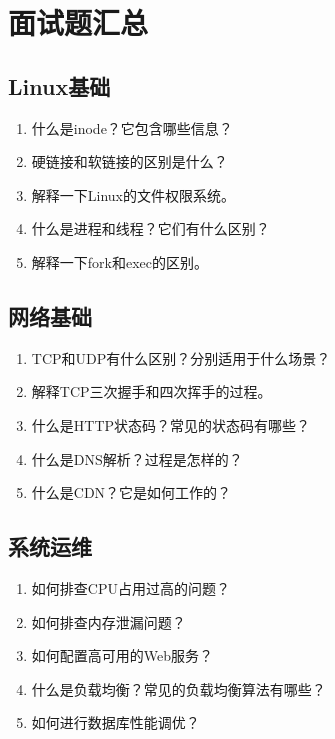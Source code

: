 \documentclass[12pt,UTF8]{ctexbook}
\begin{document}
\section{面试题汇总}
\label{sec:interview-questions}

\subsection*{Linux基础}

\begin{enumerate}
    \item 什么是inode？它包含哪些信息？
    \item 硬链接和软链接的区别是什么？
    \item 解释一下Linux的文件权限系统。
    \item 什么是进程和线程？它们有什么区别？
    \item 解释一下fork和exec的区别。
\end{enumerate}

\subsection*{网络基础}

\begin{enumerate}
    \item TCP和UDP有什么区别？分别适用于什么场景？
    \item 解释TCP三次握手和四次挥手的过程。
    \item 什么是HTTP状态码？常见的状态码有哪些？
    \item 什么是DNS解析？过程是怎样的？
    \item 什么是CDN？它是如何工作的？
\end{enumerate}

\subsection*{系统运维}

\begin{enumerate}
    \item 如何排查CPU占用过高的问题？
    \item 如何排查内存泄漏问题？
    \item 如何配置高可用的Web服务？
    \item 什么是负载均衡？常见的负载均衡算法有哪些？
    \item 如何进行数据库性能调优？
\end{enumerate}
\end{document}
